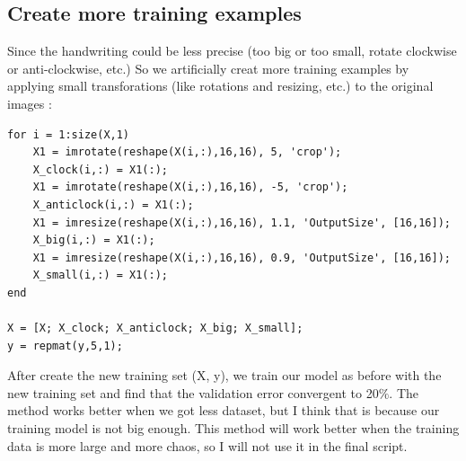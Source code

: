 \documentclass[12pt]{article}
\begin{document}
\subsection{Create more training examples}
Since the handwriting could be less precise (too big or too small, rotate clockwise or anti-clockwise, etc.) So we artificially creat more training examples by applying small transforations (like rotations and resizing, etc.) to the original images :
\begin{lstlisting}
for i = 1:size(X,1)
	X1 = imrotate(reshape(X(i,:),16,16), 5, 'crop');
	X_clock(i,:) = X1(:);
	X1 = imrotate(reshape(X(i,:),16,16), -5, 'crop');
	X_anticlock(i,:) = X1(:);
	X1 = imresize(reshape(X(i,:),16,16), 1.1, 'OutputSize', [16,16]);
	X_big(i,:) = X1(:);
	X1 = imresize(reshape(X(i,:),16,16), 0.9, 'OutputSize', [16,16]);
	X_small(i,:) = X1(:);
end

X = [X; X_clock; X_anticlock; X_big; X_small];
y = repmat(y,5,1);
\end{lstlisting}
After create the new training set (X, y), we train our model as before with the new training set and find that the validation error convergent to 20$\%$. The method works better when we got less dataset, but I think that is because our training model is not big enough. This method will work better when the training data is more large and more chaos, so I will not use it in the final script.
\end{document}
